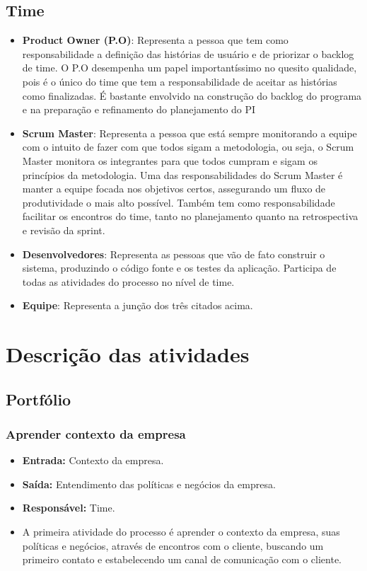 \subsection{\textbf{Time}}

  \begin{itemize}
    \item \textbf{Product Owner (P.O)}: Representa a pessoa que tem como responsabilidade a definição das histórias de usuário e de
      priorizar o backlog de time. O P.O desempenha um papel importantíssimo no quesito qualidade, pois é o único do time que tem a
      responsabilidade de aceitar as histórias como finalizadas. É bastante envolvido na construção do backlog do programa e na
      preparação e refinamento do planejamento do PI
    \item \textbf{Scrum Master}: Representa a pessoa que está sempre monitorando a equipe com o intuito de fazer com que todos sigam
      a metodologia, ou seja, o Scrum Master monitora os integrantes para que todos cumpram e sigam os princípios da metodologia.
      Uma das responsabilidades do Scrum Master é manter a equipe focada nos objetivos certos, assegurando um fluxo de produtividade
      o mais alto possível. Também tem como responsabilidade facilitar os encontros do time, tanto no planejamento quanto na
      retrospectiva e revisão da sprint.
    \item \textbf{Desenvolvedores}: Representa as pessoas que vão de fato construir o sistema, produzindo o código fonte e os testes
      da aplicação. Participa de todas as atividades do processo no nível de time.
    \item \textbf{Equipe}: Representa a junção dos três citados acima.
  \end{itemize}

\section{Descrição das atividades}

\subsection{\textbf{Portfólio}}

\subsubsection{Aprender contexto da empresa}

  \begin{itemize}
    \item \textbf{Entrada:} Contexto da empresa.
    \item \textbf{Saída:} Entendimento das políticas e negócios da empresa.
    \item \textbf{Responsável:} Time.
    \item A primeira atividade do processo é aprender o contexto da empresa, suas políticas e negócios, através de encontros com o
      cliente, buscando um primeiro contato e estabelecendo um canal de comunicação com o cliente.
  \end{itemize}

